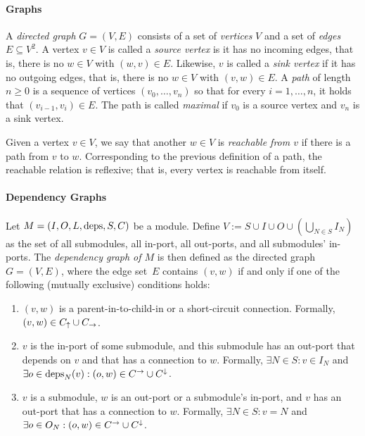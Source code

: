 \documentclass[paper=letter,fontsize=11pt,captions=tableheading]{scrartcl}
\numberwithin{equation}{section}
\theoremstyle{algorithm}
\theoremstyle{plain}
\theoremstyle{nonumberplain}
\begin{document}
\paragraph{Graphs}

A \emph{directed graph} $G = (V, E)$ consists of a set of \emph{vertices} $V$ and a set of \emph{edges} $E \subseteq V^2$. A vertex $v \in V$ is called a \emph{source vertex} is it has no incoming edges, that is, there is no $w \in V$ with $(w,v) \in E$. Likewise, $v$ is called a \emph{sink vertex} if it has no outgoing edges, that is, there is no $w \in V$ with $(v,w) \in E$. A \emph{path} of length $n \geq 0$ is a sequence of vertices $(v_0, \dots, v_n)$ so that for every $i = 1, \dots, n$, it holds that $(v_{i-1}, v_i) \in E$. The path is called \emph{maximal} if $v_0$ is a source vertex and $v_n$ is a sink vertex.

Given a vertex $v \in V$, we say that another $w \in V$ is \emph{reachable from $v$} if there is a path from $v$ to $w$. Corresponding to the previous definition of a path, the reachable relation is reflexive; that is, every vertex is reachable from itself.


\paragraph{Dependency Graphs}

Let $M = (I, O, L, \operatorname{deps}, S, C)$ be a module. Define $V :=  S \cup I \cup O \cup \left( \bigcup_{N \in S} I_N \right)$ as the set of all submodules, all in-port, all out-ports, and all submodules' in-ports. The \emph{dependency graph of $M$} is then defined as the directed graph $G = (V,E)$, where the edge set~$E$ contains $(v,w)$ if and only if one of the following (mutually exclusive) conditions holds:
\begin{enumerate}
	\item $(v,w)$ is a parent-in-to-child-in or a short-circuit connection. Formally, $(v,w) \in C_{\uparrow} \cup C_{\to}$.
	\item \label{def:depgraph:E:cond2} $v$ is the in-port of some submodule, and this submodule has an out-port that depends on $v$ and that has a connection to $w$. Formally, $\exists N \in S: v \in I_N$ and $\exists o \in \operatorname{deps}_N(v): (o,w) \in C^{\to} \cup C^{\downarrow}$.
	\item \label{def:depgraph:E:cond3} $v$ is a submodule, $w$ is an out-port or a submodule's in-port, and $v$ has an out-port that has a connection to $w$. Formally, $\exists N \in S: v = N$ and $\exists o \in O_N: (o,w) \in C^{\to} \cup C^{\downarrow}$.
\end{enumerate}
\end{document}
